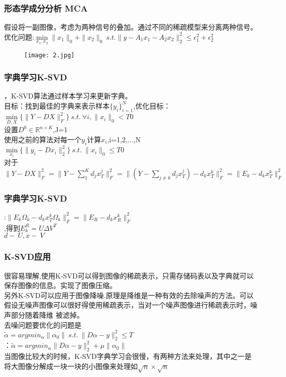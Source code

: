 \documentclass[UTF8]{beamer}
\begin{document}
\begin{frame}\frametitle{形态学成分分析 MCA}
假设将一副图像，考虑为两种信号的叠加。通过不同的稀疏模型来分离两种信号。\\
优化问题:$\min\limits_{x_{1},x_{2}}\|x_{1}\|_{0}+\|x_{2}\|_{0} \ s.t. \|y-A_{1}x_{1}-A_{2}x_{2}\|_{2}^{2} \leqslant \epsilon_{1}^{2}+\epsilon_{2}^{2}$
\begin{figure}
\begin{center}
    \texttt{[image: 2.jpg]}
\end{center}
\end{figure}
\end{frame}
\begin{frame}\frametitle{字典学习K-SVD}
，K-SVD算法通过样本学习来更新字典。\\
\noindent 目标：找到最佳的字典来表示样本$\{y_{i}\}_{i=1}^{N}$,优化目标：\\
$\min \limits_{D,X}\{\|Y-DX\|_{F}^{2}\}\ s.t. \ \forall i,\|x_{i}\|_{0}<T0$\\
\noindent 设置$D^{0} \in \mathbb{R}^{n \times K}$,J=1\\
\noindent 使用之前的算法对每一个$y_{i}$计算$x_{i}$,i=1,2,...,N\\
$\min \limits_{x_{i}}{\{\|y_{i}-Dx_{i}\|_{2}^{2}\}}\ s.t.\ \|x_{i}\|_{0} \leqslant T0$\\
对于\\$\|Y-DX\|_{F}^{2}=\|Y-\sum_{1}^{K}{d_{j}x_{T}^{j}}\|_{F}^{2}=\|(Y-\sum_{j \neq k}{d_{j}x_{T}^{j}})-d_{k}x_{T}^{k}\|_{F}^{2}
=\|E_{k}-d_{k}x_{T}^{k}\|_{F}^{2}$


\end{frame}

\begin{frame}\frametitle{字典学习K-SVD}
:$\|E_{k}\Omega_{k}-d_{k}x_{T}^{k}\Omega_{k}\|_{F}^{2}=\|E_{R}-d_{k}x_{R}^{k}\|_{F}^{2}$\\
,得到$E_{k}^{R}=U\Delta V^{T}$ \\\noindent$d-\>U,x-\>V$
\end{frame}
\begin{frame}\frametitle{K-SVD应用}
\noindent 很容易理解,使用K-SVD可以得到图像的稀疏表示，只需存储码表以及字典就可以保存图像的信息。实现了图像压缩。\\
\noindent 另外K-SVD可以应用于图像降噪.原理是降维是一种有效的去除噪声的方法。可以假设无噪声图像可以很好得使用稀疏表示，当对一个噪声图像进行稀疏表示时，噪声部分随着降维
被滤掉。\\
\noindent 去噪问题要优化的问题是\\$\widetilde{\alpha}=argmin_{\alpha}\|\alpha_{0}\| \ s.t. \ \|D\alpha-y\|_{2}^{2} \leqslant T$\\
：$\widetilde{\alpha}=argmin_{\alpha}\|D\alpha-y\|_{2}^{2} +\mu\|\alpha_{0}\|$
\\当图像比较大的时候，K-SVD字典学习会很慢，有两种方法来处理，其中之一是将大图像分解成一块一块的小图像来处理如$\sqrt{n} \times \sqrt {n}$

\end{frame}
\end{document}
